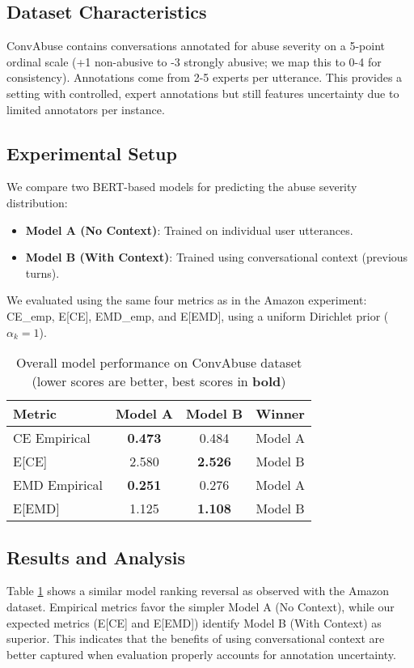 \documentclass[journal]{IEEEtran}
\begin{document}
\subsection{Dataset Characteristics}
ConvAbuse contains conversations annotated for abuse severity on a 5-point ordinal scale (+1 non-abusive to -3 strongly abusive; we map this to 0-4 for consistency). Annotations come from 2-5 experts per utterance. This provides a setting with controlled, expert annotations but still features uncertainty due to limited annotators per instance.

\subsection{Experimental Setup}
We compare two BERT-based models for predicting the abuse severity distribution:
\begin{itemize}
    \item \textbf{Model A (No Context)}: Trained on individual user utterances.
    \item \textbf{Model B (With Context)}: Trained using conversational context (previous turns).
\end{itemize}
We evaluated using the same four metrics as in the Amazon experiment: CE\_emp, E[CE], EMD\_emp, and E[EMD], using a uniform Dirichlet prior ($\alpha_k=1$).

\begin{table}[t]
\centering
\caption{Overall model performance on ConvAbuse dataset (lower scores are better, best scores in \textbf{bold})}
\label{tab:convabuse_results}
\begin{tabular}{|l|cc|c|}
\hline
\textbf{Metric} & \textbf{Model A} & \textbf{Model B} & \textbf{Winner} \\
\hline
CE Empirical & \textbf{0.473} & 0.484 & Model A \\
E[CE] & 2.580 & \textbf{2.526} & Model B \\
EMD Empirical & \textbf{0.251} & 0.276 & Model A \\
E[EMD] & 1.125 & \textbf{1.108} & Model B \\
\hline
\end{tabular}
\end{table}

\subsection{Results and Analysis}
Table \ref{tab:convabuse_results} shows a similar model ranking reversal as observed with the Amazon dataset. Empirical metrics favor the simpler Model A (No Context), while our expected metrics (E[CE] and E[EMD]) identify Model B (With Context) as superior. This indicates that the benefits of using conversational context are better captured when evaluation properly accounts for annotation uncertainty.
\end{document}
